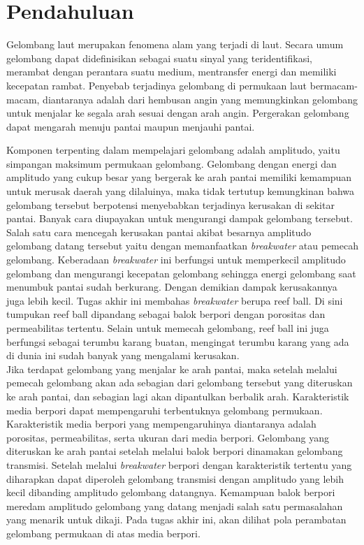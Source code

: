 \chapter{Pendahuluan}

Gelombang laut merupakan fenomena alam yang terjadi di laut. Secara
umum gelombang dapat didefinisikan sebagai suatu sinyal yang
teridentifikasi, merambat dengan perantara suatu medium, mentransfer
energi dan memiliki kecepatan rambat. Penyebab terjadinya gelombang
di permukaan laut bermacam-macam, diantaranya adalah dari hembusan
angin yang memungkinkan gelombang untuk menjalar ke segala arah
sesuai dengan arah angin. Pergerakan gelombang dapat mengarah menuju
pantai maupun menjauhi pantai.


\noindent Komponen terpenting dalam mempelajari gelombang adalah
amplitudo, yaitu simpangan maksimum permukaan gelombang. Gelombang
dengan energi dan amplitudo yang cukup besar yang bergerak ke arah
pantai memiliki kemampuan untuk merusak daerah yang dilaluinya, maka
tidak tertutup kemungkinan bahwa gelombang tersebut berpotensi
menyebabkan terjadinya kerusakan di sekitar pantai. Banyak cara
diupayakan untuk mengurangi dampak gelombang tersebut. Salah satu
cara mencegah kerusakan pantai akibat besarnya amplitudo gelombang
datang tersebut yaitu dengan memanfaatkan \emph{breakwater} atau
pemecah gelombang. Keberadaan \emph{breakwater} ini berfungsi untuk
memperkecil amplitudo gelombang dan mengurangi kecepatan gelombang
sehingga energi gelombang saat menumbuk pantai sudah berkurang.
Dengan demikian dampak kerusakannya juga lebih kecil. Tugas akhir
ini membahas \emph{breakwater} berupa reef ball. Di sini tumpukan
reef ball dipandang sebagai balok berpori dengan porositas dan
permeabilitas tertentu. Selain untuk memecah gelombang, reef ball
ini juga berfungsi sebagai terumbu karang buatan, mengingat terumbu
karang yang ada di dunia ini sudah
banyak yang mengalami kerusakan.\\


\noindent Jika terdapat gelombang yang menjalar ke arah pantai, maka
setelah melalui pemecah gelombang akan ada sebagian dari gelombang
tersebut yang diteruskan ke arah pantai, dan sebagian lagi akan
dipantulkan berbalik arah. Karakteristik media berpori dapat
mempengaruhi terbentuknya gelombang permukaan. Karakteristik media
berpori yang mempengaruhinya diantaranya adalah porositas,
permeabilitas, serta ukuran dari media berpori. Gelombang yang
diteruskan ke arah pantai setelah melalui balok berpori dinamakan
gelombang transmisi. Setelah melalui \emph{breakwater} berpori
dengan karakteristik tertentu yang diharapkan dapat diperoleh
gelombang transmisi dengan amplitudo yang lebih kecil dibanding
amplitudo gelombang datangnya.  Kemampuan balok berpori meredam
amplitudo gelombang yang datang menjadi salah satu permasalahan yang
menarik untuk dikaji. Pada tugas akhir ini, akan
dilihat pola perambatan gelombang permukaan di atas media berpori.\\


